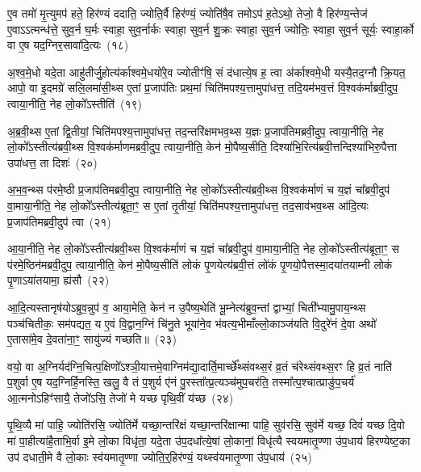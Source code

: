 ए॒व तमो॑ मृ॒त्युमप॑ हते॒ हिर॑ण्यं ददाति॒ ज्योति॒र्वै हिर॑ण्यं॒ ज्योति॑षै॒व तमो\-ऽप॑ ह॒ते\-ऽथो॒ तेजो॒ वै हिर॑ण्य॒न्तेज॑ ए॒वा\-ऽऽ\-त्मन्ध॑त्ते॒ सुव॒र्न घ॒र्मः स्वाहा॒ सुव॒र्नार्कः स्वाहा॒ सुव॒र्न शु॒क्रः स्वाहा॒ सुव॒र्न ज्योतिः॒ स्वाहा॒ सुव॒र्न सूर्यः॒ स्वाहा॒र्को वा ए॒ष यद॒ग्निर॒सावा॑दि॒त्यः~(१८)

अ॒श्व॒मे॒धो यदे॒ता आहु॑तीर्जु॒होत्य॑र्काश्वमे॒धयो॑रे॒व ज्योतीꣳ॑षि॒ सं द॑धात्ये॒ष ह॒ त्वा अ॑र्काश्वमे॒धी यस्यै॒तद॒ग्नौ क्रि॒यत॒ आपो॒ वा इ॒दमग्रे॑ सलि॒लमा॑सी॒थ्स ए॒तां प्र॒जा\-प॑तिः प्रथ॒मां चिति॑मपश्य॒त्तामुपा॑धत्त॒ तदि॒यम॑भव॒त्तं वि॒श्वक॑र्माब्रवी॒दुप॒ त्वाया॒नीति॒ नेह लो॒को᳚\-ऽस्तीति॑~(१९)

अ॒ब्र॒वी॒थ्स ए॒तां द्वि॒तीयां॒ चिति॑मपश्य॒त्तामुपा॑धत्त॒ तद॒न्तरि॑क्षमभव॒थ्स य॒ज्ञः प्र॒जा\-प॑तिमब्रवी॒दुप॒ त्वाया॒नीति॒ नेह लो॒को᳚\-ऽस्तीत्य॑ब्रवी॒थ्स वि॒श्वक॑र्माणमब्रवी॒दुप॒ त्वाया॒नीति॒ केन॑ मो॒पैष्य॒सीति॒ दिश्या॑भि॒रित्य॑ब्रवी॒त्तन्दिश्या॑भिरु॒पैत्ता उपा॑धत्त॒ ता दिशः॑~(२०)

अ॒भ॒व॒न्थ्स प॑रमे॒ष्ठी प्र॒जा\-प॑तिमब्रवी॒दुप॒ त्वाया॒नीति॒ नेह लो॒को᳚\-ऽस्तीत्य॑ब्रवी॒थ्स वि॒श्वक॑र्माणं च य॒ज्ञं चा᳚ब्रवी॒दुप॑ वा॒माया॒नीति॒ नेह लो॒को᳚\-ऽस्तीत्य॑ब्रूता॒ꣳ॒ स ए॒तां तृ॒तीयां॒ चिति॑मपश्य॒त्तामुपा॑धत्त॒ तद॒साव॑भव॒थ्स आ॑दि॒त्यः प्र॒जा\-प॑तिमब्रवी॒दुप॑ त्वा~(२१)

आ॒या॒नीति॒ नेह लो॒को᳚\-ऽस्तीत्य॑ब्रवी॒थ्स वि॒श्वक॑र्माणं च य॒ज्ञं चा᳚ब्रवी॒दुप॑ वा॒माया॒नीति॒ नेह लो॒को᳚\-ऽस्तीत्य॑ब्रूता॒ꣳ॒ स प॑रमे॒ष्ठिन॑मब्रवी॒दुप॒ त्वाया॒नीति॒ केन॑ मो॒पैष्य॒सीति॑ लोकं पृ॒णयेत्य॑ब्रवी॒त्तं लो॑कं पृ॒णयो॒पैत्तस्मा॒दया॑तयाम्नी लोकं पृ॒णा\-ऽया॑तयामा॒ ह्य॑सौ~(२२)

आ॒दि॒त्यस्तानृष॑यो\-ऽब्रुव॒न्नुप॑ व॒ आया॒मेति॒ केन॑ न उ॒पैष्य॒थेति॑ भू॒म्नेत्य॑ब्रुव॒न्तां द्वाभ्यां॒ चिती᳚भ्यामु॒पाय॒न्थ्स पञ्च॑चितीकः॒ सम॑पद्यत॒ य ए॒वं वि॒द्वान॒ग्निं चि॑नु॒ते भूया॑ने॒व भ॑वत्य॒भीमाँल्लो॒काञ्ज॑यति वि॒दुरे॑नं दे॒वा अथो॑ ए॒तासा॑मे॒व दे॒वता॑ना॒ꣳ॒ सायु॑ज्यं गच्छति॥~(२३)

{\anuvakamend[{तम॑सा\-ऽऽ\-दि॒त्यो᳚\-ऽस्तीति॒ दिश॑ आदि॒त्यः प्र॒जा\-प॑तिमब्रवी॒दुप॑ त्वा॒\-ऽसौ पञ्च॑चत्वारिꣳशच्च}]}%

वयो॒ वा अ॒ग्निर्यद॑ग्नि॒चित्प॒क्षिणो᳚\-ऽश्ञी॒यात्तमे॒वाग्निम॑द्या॒दार्ति॒मार्च्छे᳚थ्संवथ्स॒रं व्र॒तं च॑रेथ्संवथ्स॒रꣳ हि व्र॒तं नाति॑ प॒शुर्वा ए॒ष यद॒ग्निर्\mbox{}हि॒नस्ति॒ खलु॒ वै तं प॒शुर्य ए॑नं पु॒रस्ता᳚त्प्र॒त्यञ्च॑मुप॒चर॑ति॒ तस्मा᳚त्प॒श्चात्प्राङु॑प॒चर्य॑ आ॒त्मनो\-ऽहिꣳ॑सायै॒ तेजो॑\-ऽसि॒ तेजो॑ मे यच्छ पृथि॒वीं य॑च्छ~(२४)

पृ॒थि॒व्यै मा॑ पाहि॒ ज्योति॑रसि॒ ज्योति॑र्मे यच्छा॒न्तरि॑क्षं यच्छा॒न्तरि॑क्षान्मा पाहि॒ सुव॑रसि॒ सुव॑र्मे यच्छ॒ दिवं॑ यच्छ दि॒वो मा॑ पा॒हीत्या॑है॒ताभि॒र्वा इ॒मे लो॒का विधृ॑ता॒ यदे॒ता उ॑प॒दधा᳚त्ये॒षां लो॒कानां॒ विधृ॑त्यै स्वयमातृ॒ण्णा उ॑प॒धाय॑ हिरण्येष्ट॒का उप॑ दधाती॒मे वै लो॒काः स्व॑यमातृ॒ण्णा ज्योति॒र्॒\mbox{}हिर॑ण्यं॒ यथ्स्व॑यमातृ॒ण्णा उ॑प॒धाय॑~(२५)

